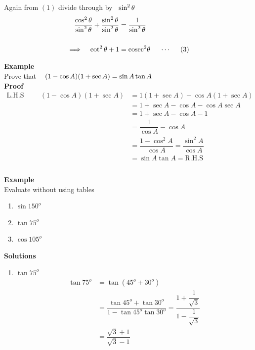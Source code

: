 \documentclass[11pt,a4paper]{article}
\begin{document}
Again from $(1)$ divide through by $\hspace{0.2cm} \sin^2\theta$
\begin{align*}
\dfrac{\cos^2\theta}{\sin^2\theta} + \dfrac{\sin^2\theta}{\sin^2\theta} & = \dfrac{1}{\sin^2\theta}\\\\
\implies \hspace{0.3cm} \cot^2 \theta + 1 & = \text{cosec}^2\theta \hspace{0.5cm} \cdots\hspace{0.5cm} (3)\\
\end{align*}






\textbf{Example}\\
Prove that $\hspace{0.3cm} (1 - \cos A)(1 + \sec A) = \sin A\tan A$\\


\textbf{Proof}
\begin{align*}
\text{L.H.S}\hspace{1cm} (1 - \cos A)(1 + \sec A) & = 1( 1 + \sec A) - \cos A ( 1 + \sec A)\\
& = 1 + \sec A - \cos A - \cos A\sec A\\
& = 1 + \sec A - \cos A - 1\\
& = \dfrac{1}{\cos A} - \cos A\\
& = \dfrac{1 - \cos^2 A}{\cos A} = \dfrac{\sin^2A}{\cos A}\\
& = \sin A \tan A = \text{R.H.S}\\\\
\end{align*}




\textbf{Example}\\
Evaluate without using tables
\begin{enumerate}
\item[i.] $\sin 150^o$
\item[ii.] $\tan 75^o$
\item[iii.] $\cos 105^o$\\
\end{enumerate}




\textbf{Solutions}
\begin{enumerate}
\item[ii] $\tan 75^o$
\begin{align*}
\tan 75^o & = \tan (45^o + 30^o)\\
& = \dfrac{\tan 45^o + \tan 30^o}{1 - \tan 45^o\tan 30^o} = \dfrac{1 + \dfrac{1}{\sqrt{3}}}{1 - \dfrac{1}{\sqrt{3}}}\\
& = \dfrac{\sqrt{3} + 1}{\sqrt{3} - 1}\\\\
\end{align*}
\end{enumerate}
\end{document}
